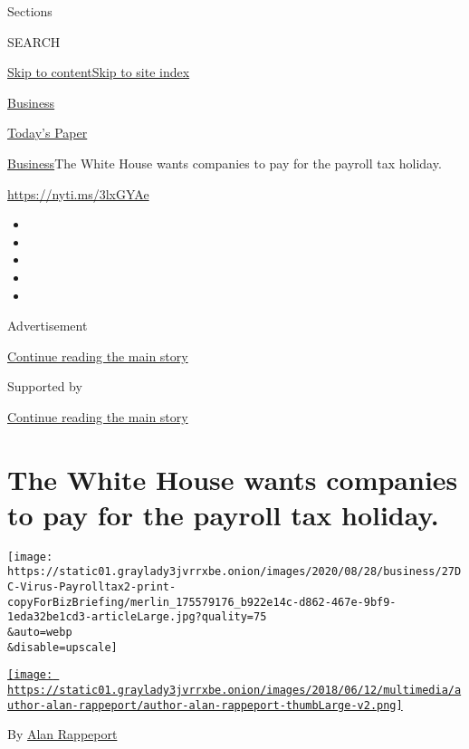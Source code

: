 Sections

SEARCH

\protect\hyperlink{site-content}{Skip to
content}\protect\hyperlink{site-index}{Skip to site index}

\href{https://www.nytimes3xbfgragh.onion/section/business}{Business}

\href{https://myaccount.nytimes3xbfgragh.onion/auth/login?response_type=cookie\&client_id=vi}{}

\href{https://www.nytimes3xbfgragh.onion/section/todayspaper}{Today's
Paper}

\href{/section/business}{Business}\textbar{}The White House wants
companies to pay for the payroll tax holiday.

\url{https://nyti.ms/3lxGYAe}

\begin{itemize}
\item
\item
\item
\item
\item
\end{itemize}

Advertisement

\protect\hyperlink{after-top}{Continue reading the main story}

Supported by

\protect\hyperlink{after-sponsor}{Continue reading the main story}

\hypertarget{the-white-house-wants-companies-to-pay-for-the-payroll-tax-holiday}{%
\section{The White House wants companies to pay for the payroll tax
holiday.}\label{the-white-house-wants-companies-to-pay-for-the-payroll-tax-holiday}}

\texttt{[image: https://static01.graylady3jvrrxbe.onion/images/2020/08/28/business/27DC-Virus-Payrolltax2-print-copyForBizBriefing/merlin\_175579176\_b922e14c-d862-467e-9bf9-1eda32be1cd3-articleLarge.jpg?quality=75\\\&auto=webp\\\&disable=upscale]}

\href{https://www.nytimes3xbfgragh.onion/by/alan-rappeport}{\texttt{[image: https://static01.graylady3jvrrxbe.onion/images/2018/06/12/multimedia/author-alan-rappeport/author-alan-rappeport-thumbLarge-v2.png]}}

By \href{https://www.nytimes3xbfgragh.onion/by/alan-rappeport}{Alan
Rappeport}

